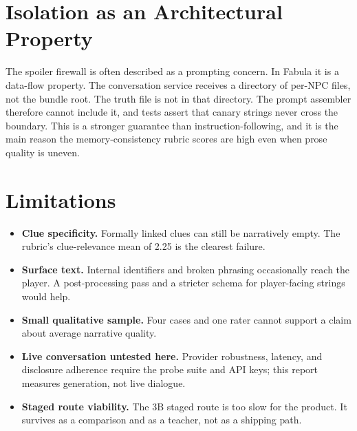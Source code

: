 ﻿\documentclass[11pt,a4paper]{report}
\begin{document}
\section{Isolation as an Architectural Property}
The spoiler firewall is often described as a prompting concern. In Fabula it is a data-flow property. The conversation service receives a directory of per-NPC files, not the bundle root. The truth file is not in that directory. The prompt assembler therefore cannot include it, and tests assert that canary strings never cross the boundary. This is a stronger guarantee than instruction-following, and it is the main reason the memory-consistency rubric scores are high even when prose quality is uneven.

\section{Limitations}
\begin{itemize}
  \item \textbf{Clue specificity.} Formally linked clues can still be narratively empty. The rubric's clue-relevance mean of 2.25 is the clearest failure.
  \item \textbf{Surface text.} Internal identifiers and broken phrasing occasionally reach the player. A post-processing pass and a stricter schema for player-facing strings would help.
  \item \textbf{Small qualitative sample.} Four cases and one rater cannot support a claim about average narrative quality.
  \item \textbf{Live conversation untested here.} Provider robustness, latency, and disclosure adherence require the probe suite and API keys; this report measures generation, not live dialogue.
  \item \textbf{Staged route viability.} The 3B staged route is too slow for the product. It survives as a comparison and as a teacher, not as a shipping path.
\end{itemize}
\end{document}
